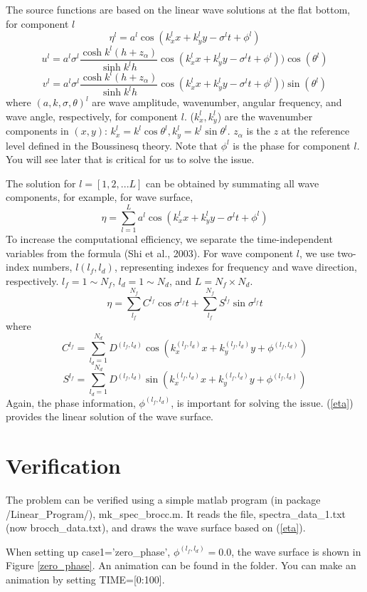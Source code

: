 \documentclass[preprint,10pt]{elsarticle}
\newcommand{\be}{\begin{equation}}
\newcommand{\ee}{\end{equation}}
\begin{document}
 The source functions are based on the linear wave solutions at the flat bottom, for component $l$
 \be
 \eta^l = a^l \cos(k_x^l x + k_y^l y - \sigma^l t + \phi^l)
 \ee
 \be
 u^l = a^l \sigma^l \frac{\cosh k^l(h+z_\alpha)}{\sinh k^l h} \cos(k_x^l x + k_y^l y - \sigma^l t + \phi^l))\cos(\theta^l)
 \ee
  \be
 v^l = a^l \sigma^l \frac{\cosh k^l(h+z_\alpha)}{\sinh k^l h} \cos(k_x^l x + k_y^l y - \sigma^l t + \phi^l))\sin(\theta^l)
 \ee
 where $(a, k, \sigma, \theta)^l$ are wave amplitude, wavenumber, angular frequency, and wave angle, respectively, for component $l$. ($k^l_x,k^l_y$) are the wavenumber components in $(x,y)$:  $k^l_x = k^l \cos\theta^l, k^l_y = k^l \sin \theta^l$.  $z_\alpha$ is the $z$ at the reference level defined in the Boussinesq theory.  Note that $\phi^l$ is the phase for component $l$. You will see later that is critical for us to solve the issue. 
 
 The solution for $l=[1,2,... L]$ can be obtained by summating all wave components, for example, for wave surface,
 \be
 \eta = \sum_{l=1}^{L}  a^l \cos(k_x^l x + k_y^l y - \sigma^l t + \phi^l)
 \ee
 To increase the computational efficiency, we separate the time-independent variables from the formula (Shi et al., 2003). For wave component $l$,  we use two-index numbers, $l(l_f, l_d)$, representing indexes for frequency and wave direction, respectively. $l_f = 1 \sim N_f$, $l_d = 1 \sim N_d$, and $L = N_f \times N_d$.
 \be
  \eta = \sum_{l_f}^{N_f} C^{l_f} \cos \sigma^{l_f} t + \sum_{l_f}^{N_f} S^{l_f} \sin \sigma^{l_f} t
  \label{eta}
 \ee
 where
 \be
 C^{l_f} = \sum_{l_d=1}^{N_d} D^{(l_f,l_d)} \cos\left(k_x^{(l_f,l_d)}  x +k_y^{(l_f,l_d)}  y +\phi^{(l_f,l_d)}\right )
 \ee
  \be
 S^{l_f} = \sum_{l_d=1}^{N_d} D^{(l_f,l_d)} \sin\left(k_x^{(l_f,l_d)}  x +k_y^{(l_f,l_d)}  y +\phi^{(l_f,l_d)}\right )
 \ee
 Again, the phase information, $\phi^{(l_f,l_d)}$, is important for solving the issue. (\ref{eta}) provides the linear solution of the wave surface. 
 
 \section{Verification}
 The problem can be verified using a simple matlab program (in package /Linear\_Program/), mk\_spec\_brocc.m. It reads the file, spectra\_data\_1.txt (now brocch\_data.txt), and draws the wave surface based on (\ref{eta}). 
 
 When setting up case1='zero\_phase', $\phi^{(l_f,l_d)} = 0.0$, the wave surface is shown in Figure \ref{zero_phase}. An animation can be found in the folder. You can make an animation by setting TIME=[0:100]. 
 
\end{document}
